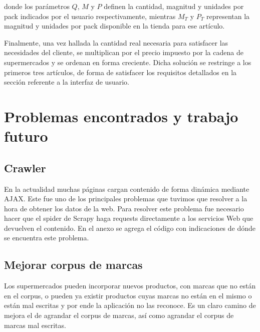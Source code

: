 \documentclass[12pt]{article} %
\begin{document}
donde los parámetros $Q$, $M$ y $P$ definen la cantidad, magnitud y unidades por pack indicados por el usuario respectivamente, mientras $M_T$ y $P_T$ representan la magnitud y unidades por pack disponible en la tienda para ese artículo.

Finalmente, una vez hallada la cantidad real necesaria para satisfacer las necesidades del cliente, se multiplican por el precio impuesto por la cadena de supermercados y se ordenan en forma creciente. Dicha solución se restringe a los primeros tres artículos, de forma de satisfacer los requisitos detallados en la sección referente a la interfaz de usuario.


\section{Problemas encontrados y trabajo futuro}


\subsection{Crawler}

En la actualidad muchas páginas cargan contenido de forma dinámica mediante AJAX. Este fue uno de los principales problemas que tuvimos que resolver a la hora de obtener los datos de la web. Para resolver este problema fue necesario hacer que el spider de Scrapy haga requests directamente a los servicios Web que devuelven el contenido. En el anexo se agrega el código con indicaciones de dónde se encuentra este problema.


\subsection{Mejorar corpus de marcas}
Los supermercados pueden incorporar nuevos productos, con marcas que no están en el corpus, o pueden ya existir productos cuyas marcas no están en el mismo o están mal escritas y por ende la aplicación no las reconoce. Es un claro camino de mejora el de agrandar el corpus de marcas, así como agrandar el corpus de marcas mal escritas.
\end{document}
